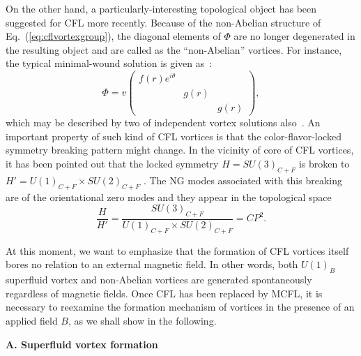 \documentclass[12pt]{article}
\begin{document}
On the other hand, a particularly-interesting topological object has been suggested for
CFL more recently. Because of the non-Abelian structure of Eq.~(\ref{eq:cflvortexgroup}), the
diagonal elements of $\Phi$ are no longer degenerated in the resulting object and are called as
the ``non-Abelian'' vortices. For instance, the typical minimal-wound solution is given
as~\cite{nakano2008non,eto2009color}:
\begin{equation}
  \label{eq:nvortex}
  \Phi = v\begin{pmatrix}
   f(r)e^{i\theta} & & \\ & g(r) & \\ & & g(r)
  \end{pmatrix},
\end{equation}
which may be described by two of independent vortex solutions also~\cite{balachandran2006semisuperfluid}.
An important property of such kind of CFL vortices
%
is that the color-flavor-locked symmetry breaking pattern might change. In the vicinity of core of CFL
vortices, it has been pointed out that the locked symmetry $H={SU(3)_{C+F}}$ is broken to
$H' =U(1)_{C+F} \times SU(2)_{C+F}$ \cite{nakano2008non,vinci2012spontaneous}.
The NG modes associated with this breaking are of the orientational zero modes and they appear in the
topological space
\begin{equation}
  \label{eq:cp2}
 \frac{H}{H'} = \frac{SU(3)_{C+F}}{U(1)_{C+F} \times SU(2)_{C+F}} = CP^2.
\end{equation}

At this moment, we want to emphasize that the formation of CFL vortices itself bores no relation to an
external magnetic field. In other words, both $U(1)_{B}$ superfluid vortex and non-Abelian vortices are
generated spontaneously regardless of magnetic fields.
Once CFL has been replaced by MCFL, it is necessary to reexamine the formation mechanism of vortices in
the presence of an applied field $B$, as we shall show in the following.

\vspace{0.2cm}
\textbf{A. Superfluid vortex formation }
\vspace{0.2cm}
\end{document}
